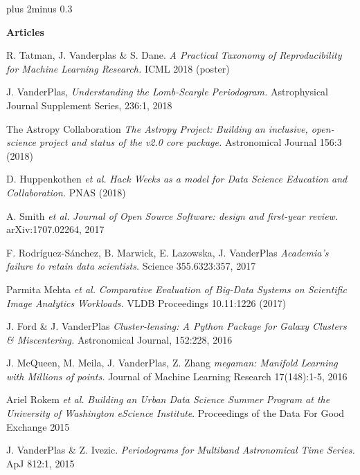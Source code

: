 \documentclass{article} %
\def\bf{\bfseries}
\def\sf{\sffamily}
\newlength\sidebarwidth
\newcommand{\smalltopic}[2]%
	 {\pagebreak[2]%
	 \vskip 1\baselineskip plus 2\baselineskip minus 0.3\baselineskip
	 \begin{minipage}{\textwidth}
         \phantomsection\addcontentsline{toc}{subsection}{#1}%
         \nopagebreak\hspace{0in}%
         \nopagebreak\begin{minipage}[t]{\sidebarwidth - .2cm}
         \raggedleft \bf\sf %
	 \textcolor{dark_blue}{\large #1}%
	 \end{minipage}%
	 \hfill
	 \begin{minipage}[t]{\linewidth - \sidebarwidth}
	 \nopagebreak{%
	    \rule{\linewidth}{.5pt}%
	    \vspace{.1\baselineskip}%
	    }%
	    #2
	 \end{minipage}
	 \end{minipage}}
\begin{document}
\smalltopic{\hspace*{-3ex} Articles}{
  \begin{itemize}[leftmargin=0ex, itemsep=0ex, parsep=.5ex, labelindent=-4ex]

    \publication
          R. Tatman, J. Vanderplas \& S. Dane.
          {\it A Practical Taxonomy of Reproducibility for Machine Learning Research.}
          ICML 2018 (poster)
    
    \publication
          J. VanderPlas,
          {\it Understanding the Lomb-Scargle Periodogram.}
          Astrophysical Journal Supplement Series, 236:1, 2018

    \publication
          The Astropy Collaboration
          {\it The Astropy Project: Building an inclusive, open-science project and status of the v2.0 core package.}
          Astronomical Journal 156:3 (2018)
          
    \publication
          D. Huppenkothen {\it et al.}
          {\it Hack Weeks as a model for Data Science Education and Collaboration.}
          PNAS (2018)

    \publication
          A. Smith {\it et al.}
          {\it Journal of Open Source Software: design and first-year review.}
          arXiv:1707.02264, 2017
          
    \publication
          F. Rodríguez-Sánchez, B. Marwick, E. Lazowska, J. VanderPlas
          {\it Academia's failure to retain data scientists.}
          Science 355.6323:357, 2017

    \publication
          Parmita Mehta {\it et al.}
          {\it Comparative Evaluation of Big-Data Systems on Scientific Image Analytics Workloads.}
          VLDB Proceedings 10.11:1226 (2017)

    \publication
	  J. Ford \& J. VanderPlas
	  {\it Cluster-lensing: A Python Package for Galaxy Clusters \& Miscentering.}
	  Astronomical Journal, 152:228, 2016

    \publication
      J. McQueen, M. Meila, J. VanderPlas, Z. Zhang
      {\it megaman: Manifold Learning with Millions of points.}
      Journal of Machine Learning Research 17(148):1-5, 2016

    \publication
      Ariel Rokem {\it et al.}
      {\it Building an Urban Data Science Summer Program at the University of Washington eScience Institute}.
      Proceedings of the Data For Good Exchange 2015

    \publication
      J. VanderPlas \& Z. Ivezic.
      {\it Periodograms for Multiband Astronomical Time Series.}
      ApJ 812:1, 2015


\end{itemize}}
\end{document}
